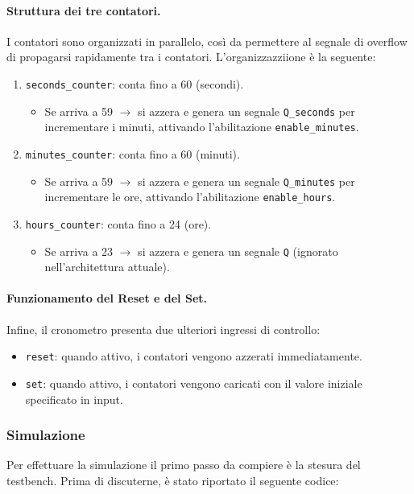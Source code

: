 \paragraph{Struttura dei tre contatori.}
I contatori sono organizzati in parallelo, così da permettere al segnale di overflow di propagarsi rapidamente tra i contatori. L'organizzazziione è la seguente:

\begin{enumerate}
    \item \texttt{seconds\_counter}: conta fino a 60 (secondi).
    \begin{itemize}
        \item Se arriva a 59 $\rightarrow$ si azzera e genera un segnale \texttt{Q\_seconds} per incrementare i minuti, attivando l’abilitazione \texttt{enable\_minutes}.
    \end{itemize}
    \item \texttt{minutes\_counter}: conta fino a 60 (minuti).
    \begin{itemize}
        \item Se arriva a 59 $\rightarrow$ si azzera e genera un segnale \texttt{Q\_minutes} per incrementare le ore, attivando l’abilitazione \texttt{enable\_hours}.
    \end{itemize}
    \item \texttt{hours\_counter}: conta fino a 24 (ore).
    \begin{itemize}
        \item Se arriva a 23 $\rightarrow$ si azzera e genera un segnale \texttt{Q} (ignorato nell'architettura attuale).
    \end{itemize}
\end{enumerate}

\paragraph{Funzionamento del Reset e del Set.}
Infine, il cronometro presenta due ulteriori ingressi di controllo:

\begin{itemize}
    \item \texttt{reset}: quando attivo, i contatori vengono azzerati immediatamente.
    \item \texttt{set}: quando attivo, i contatori vengono caricati con il valore iniziale specificato in input.
\end{itemize}

\subsubsection{Simulazione}
Per effettuare la simulazione il primo passo da compiere è la stesura del testbench. Prima di discuterne, è stato riportato il seguente codice:

